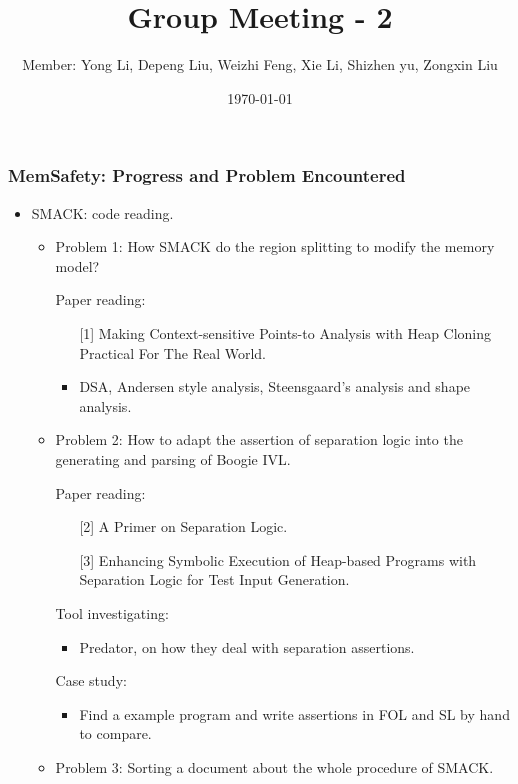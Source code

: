 \documentclass[aspectratio=1610]{beamer}
\title{Group Meeting - 2}
\date{\today}
\author{Member: Yong Li, Depeng Liu, Weizhi Feng, Xie Li, Shizhen yu, Zongxin Liu}
\begin{document}
\maketitle

\begin{frame}\frametitle{MemSafety: Progress and Problem Encountered}

\begin{itemize}
\item SMACK: code reading.
\begin{itemize}
\item Problem 1: How SMACK do the region splitting to modify the memory model? 

Paper reading: 
\begin{itemize}
\item 
[{[1]}] Making Context-sensitive Points-to Analysis with Heap Cloning Practical For The Real World.
\item DSA, Andersen style analysis, Steensgaard's analysis and shape analysis.
\end{itemize}


\item Problem 2: How to adapt the assertion of separation logic into the generating and parsing of Boogie IVL.

Paper reading: 

\begin{itemize}
\item [{[2]}] A Primer on Separation Logic.
\item [{[3]}] Enhancing Symbolic Execution of Heap-based Programs with Separation Logic for Test Input Generation.
\end{itemize}

Tool investigating:

\begin{itemize}
\item Predator, on how they deal with separation assertions.
\end{itemize}

Case study: 
\begin{itemize}
\item Find a example program and write assertions in FOL and SL by hand to compare.
\end{itemize}


\item Problem 3: Sorting a document about the whole procedure of SMACK.
\end{itemize}
\end{itemize}
\end{frame}
\end{document}
